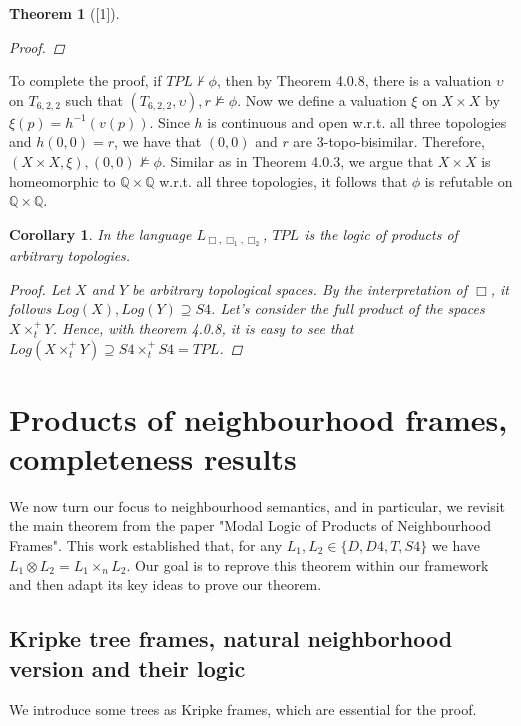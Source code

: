 \documentclass[12pt, a4paper]{scrartcl}
\newtheorem{corollary}[definition]{Corollary}
\newtheorem{theorem}[definition]{Theorem}
\begin{document}
\begin{theorem}[\textnormal{[1]}]
\begin{proof}
    \end{proof}

\end{theorem}

To complete the proof, if $\mathit{TPL} \nvdash \phi$, then by Theorem 4.0.8, there is a 
valuation $\upsilon$ on $T_{6,2,2}$ such that $(T_{6,2,2}, \upsilon), r \nvDash \phi$. Now we define a valuation $\xi$
on $X \times X$ by $\xi(p) = h^{-1}(v(p))$. Since $h$ is continuous and open w.r.t. all three topologies and $h(0,0) = r$,
we have that $(0,0)$ and $r$ are 3-topo-bisimilar. Therefore, $(X \times X, \xi),(0,0) \nvDash \phi$. Similar as in Theorem 4.0.3, we argue
that $X \times X$ is homeomorphic to $\mathbb{Q} \times \mathbb{Q}$ w.r.t. all three topologies, it follows that $\phi$ is refutable on $\mathbb{Q} \times \mathbb{Q}$.

\begin{corollary}
    In the language $L_{\Box, \Box_1, \Box_2}$, $\mathit{TPL}$ is the logic of products of arbitrary topologies.
    \begin{proof}
        Let $X$ and $Y$ be arbitrary topological spaces. By the interpretation of $\Box$, it follows
        $Log(X), Log(Y) \supseteq S4$. Let's consider the full product of the spaces $X \times^+_t Y$.
        Hence, with theorem 4.0.8, it is easy to see that $Log(X \times^+_t Y) \supseteq S4 \times^+_t S4 = \mathit{TPL}$.

    \end{proof}

\end{corollary}

\clearpage

\section{Products of neighbourhood frames, completeness results}
We now turn our focus to neighbourhood semantics, and in particular, we revisit the main theorem from the paper "Modal Logic of Products of Neighbourhood Frames". This work established that, for any $L_1, L_2 \in \{D,D4,T,S4\}$ we have
$L_1 \otimes L_2 = L_1 \times_n L_2$.
Our goal is to reprove this theorem within our framework and then adapt its key ideas to prove our theorem. 

\subsection{Kripke tree frames, natural neighborhood version and their logic}
We introduce some trees as Kripke frames, which are essential for the proof.
\end{document}
